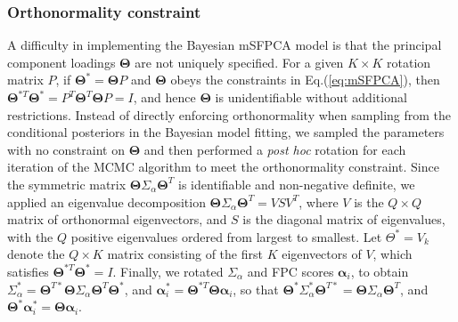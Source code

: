 \documentclass[aoas,preprint]{imsart}
\begin{document}
\subsubsection{Orthonormality constraint}
A difficulty in implementing the Bayesian mSFPCA model is that the principal component loadings $\boldsymbol\Theta$ are not uniquely specified. 
For a given $K \times K$ rotation matrix $P$, if $\boldsymbol\Theta^* = \boldsymbol\Theta P$ and $\boldsymbol\Theta$ obeys the constraints in Eq.(\ref{eq:mSFPCA}), then $\boldsymbol\Theta^{*T} \boldsymbol\Theta^*= P^T \boldsymbol\Theta^T \boldsymbol\Theta P = I$, and hence $\boldsymbol\Theta$ is unidentifiable without additional restrictions. Instead of directly enforcing orthonormality when sampling from the conditional posteriors in the Bayesian model fitting, we sampled the parameters with no constraint on $\boldsymbol\Theta$ and then performed a {\it post hoc} rotation for each 
iteration of the MCMC algorithm to meet the orthonormality constraint.
Since the symmetric matrix $\boldsymbol\Theta \Sigma_\alpha \boldsymbol\Theta^T $ is identifiable and non-negative definite, we applied an eigenvalue decomposition $\boldsymbol\Theta \Sigma_\alpha \boldsymbol\Theta^T = V S V^T$, where $V$ is the $Q \times Q$ matrix of orthonormal eigenvectors, and $S$ is the diagonal matrix of eigenvalues, with the $Q$ positive eigenvalues ordered from largest to smallest. Let $\Theta^* = V_k$ denote the $Q \times K$ matrix consisting of the first $K$ eigenvectors of $V$, which satisfies $\boldsymbol\Theta^{*T} \boldsymbol\Theta^{*} = I$. 
Finally, we rotated $\Sigma_\alpha$ and FPC scores $\boldsymbol\alpha_i$, to obtain $\Sigma_\alpha^{*} = \boldsymbol\Theta^{T*} \boldsymbol\Theta \Sigma_\alpha \boldsymbol\Theta^T \boldsymbol\Theta^{*}$, and $\boldsymbol \alpha_i^* = \boldsymbol\Theta^{*T} \boldsymbol\Theta \boldsymbol\alpha_i$, so that $\boldsymbol\Theta^{*} \Sigma_\alpha^{*} \boldsymbol\Theta^{T*} = \boldsymbol\Theta \Sigma_\alpha \boldsymbol\Theta^T$, and $\boldsymbol\Theta^* \boldsymbol\alpha_i^{*} = \boldsymbol\Theta \boldsymbol\alpha_i$.
\end{document}
